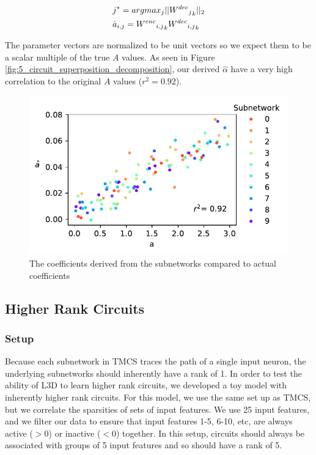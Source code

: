 \documentclass{article}
\theoremstyle{plain}
\theoremstyle{definition}
\theoremstyle{remark}
\begin{document}
\begin{align}
    &j^* = argmax_{j} ||{{{W^{dec}}_j}_k}||_2 \\
    &\hat{a}_{i,j} = {{{W^{enc}}_{i,j}}}_k {{W^{dec}}_{i,j}}_k \notag
\end{align}

The parameter vectors are normalized to be unit vectors so we expect them to be a scalar multiple of the true $A$ values. As seen in Figure \ref{fig:5_circuit_superposition_decomposition}, our derived $\hat{\alpha}$ have a very high correlation to the original $A$ values ($r^2 = 0.92$).



\begin{figure}[htbp]
    \centerline{\includegraphics[width=\columnwidth]{../figures/6_circuit_superposition_coefficients.pdf}}
    \centering
    \caption{The coefficients derived from the subnetworks compared to actual coefficients}\label{fig:6_circuit_superposition_coefficients}
\end{figure}


\subsection{Higher Rank Circuits}

\subsubsection{Setup}
Because each subnetwork in TMCS traces the path of a single input neuron, the underlying subnetworks should inherently have a rank of 1. In order to test the ability of L3D to learn higher rank circuits, we developed a toy model with inherently higher rank circuits. For this model, we use the same set up as TMCS, but we correlate the sparsities of sets of input features. We use 25 input features, and we filter our data to ensure that input features 1-5, 6-10, etc, are always active ($>0$) or inactive ($<0$) together. In this setup, circuits should always be associated with groups of 5 input features and so should have a rank of 5.
\end{document}
